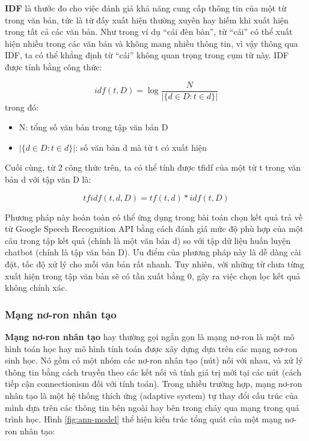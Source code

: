 \documentclass[12pt]{report}
\begin{document}
\textbf{IDF} là thước đo cho việc đánh giá khả năng cung cấp thông tin của một từ trong văn bản, tức là từ đấy xuất hiện thường xuyên hay hiếm khi xuất hiện trong tất cả các văn bản. Như trong ví dụ ``cái đèn bàn'', từ ``cái'' có thể xuất hiện nhiều trong các văn bản và không mang nhiều thông tin, vì vậy thông qua IDF, ta có thể khẳng định từ ``cái'' không quan trọng trong cụm từ này. IDF được tính bằng công thức:

\[idf(t, D) = \log\frac{N}{|\{d \in D: t \in d\}|}\]
trong đó:
\begin{itemize}
	\item N: tổng số văn bản trong tập văn bản D
	\item $|\{d \in D: t \in d\}|$: số văn bản d mà từ t có xuất hiện
\end{itemize}

Cuối cùng, từ 2 công thức trên, ta có thể tính được tfidf của một từ t trong văn bản d với tập văn D là:

\[tfidf(t, d, D) = tf(t, d) * idf(t, D)\]

Phương pháp này hoàn toàn có thể ứng dụng trong bài toán chọn kết quả trả về từ Google Speech Recognition API bằng cách đánh giá mức độ phù hợp của một câu trong tập kết quả (chính là một văn bản d) so với tập dữ liệu huấn luyện chatbot (chính là tập văn bản D). Ưu điểm của phương pháp này là dễ dàng cài đặt, tốc độ xử lý cho mỗi văn bản rất nhanh. Tuy nhiên, với những từ chưa từng xuất hiện trong tập văn bản sẽ có tần xuất bằng 0, gây ra việc chọn lọc kết quả không chính xác.

\subsubsection{Mạng nơ-ron nhân tạo}

\textbf{Mạng nơ-ron nhân tạo} hay thường gọi ngắn gọn là mạng nơ-ron là một mô hình toán học hay mô hình tính toán được xây dựng dựa trên các mạng nơ-ron sinh học. Nó gồm có một nhóm các nơ-ron nhân tạo (nút) nối với nhau, và xử lý thông tin bằng cách truyền theo các kết nối và tính giá trị mới tại các nút (cách tiếp cận connectionism đối với tính toán). Trong nhiều trường hợp, mạng nơ-ron nhân tạo là một hệ thống thích ứng (adaptive system) tự thay đổi cấu trúc của mình dựa trên các thông tin bên ngoài hay bên trong chảy qua mạng trong quá trình học. Hình \ref{fig:ann-model} thể hiện kiến trúc tổng quát của một mạng nơ-ron nhân tạo:
\end{document}
